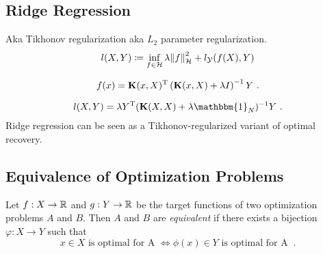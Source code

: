 \subsection{Ridge Regression}

Aka Tikhonov regularization aka $L_2$ parameter regularization.
\begin{equation}
	\label{eq:ridge-regression-loss}
	l(X, Y) \coloneqq \inf_{f \in \mathcal{H}} \lambda \norm{f}_\mathcal{H}^2 
	+ l_{\mathcal{Y}} (f(X), Y)
\end{equation}

\begin{equation}
	\label{eq:ridge-regression-f}
	f(x) = \mathbf{K}(x, X)^{\mathrm{T}} \left(\mathbf{K}(x, X) + \lambda I\right)^{-1}Y \ .
\end{equation}

\begin{equation}
	\label{eq:ridge-regression-loss-se-closed-form}
	l(X, Y) = \lambda Y^\T (\mathbf{K}(X, X) + \lambda \mathbbm{1}_N)^{-1} Y \ .
\end{equation}
Ridge regression can be seen as a Tikhonov-regularized variant of optimal recovery.

\subsection{Equivalence of Optimization Problems}

\begin{definition}
	\label{def:equivalent-problems}
	Let $f: X \rightarrow \mathbb{R}$ and $g: Y \rightarrow \mathbb{R}$ be the target functions of two optimization problems $A$ and $B$.
	Then $A$ and $B$ are \emph{equivalent} if there exists a bijection $\varphi: X \rightarrow Y$ such that
	\begin{equation}
		x \in X \text{~is optimal for A~} \Leftrightarrow \phi(x) \in Y \text{~is optimal for A~}\ .
	\end{equation}
\end{definition}